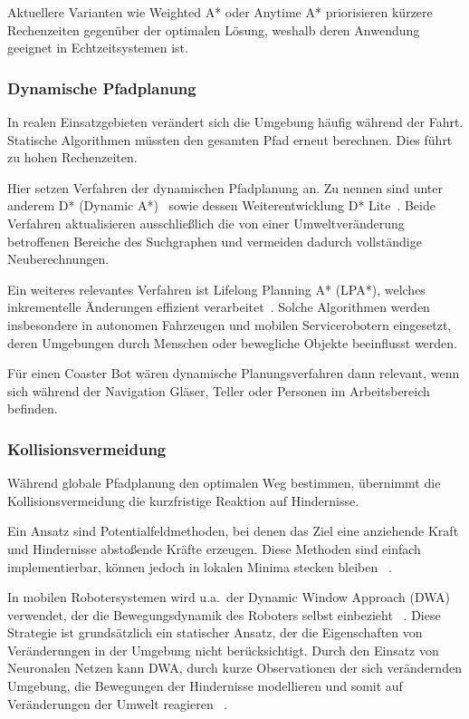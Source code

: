 \documentclass[
  a4paper,
  12pt,
  DIV=12,        %
  parskip=half,  %
  headings=small %
]{scrartcl}
\theoremstyle{definition}
\theoremstyle{definition}
\begin{document}
Aktuellere Varianten wie Weighted A* oder Anytime A* priorisieren kürzere
Rechenzeiten gegenüber der optimalen Lösung, weshalb deren Anwendung geeignet in
Echtzeitsystemen ist\cite{WeightedA,AnytimeA}.

\subsubsection{Dynamische Pfadplanung}

In realen Einsatzgebieten verändert sich die Umgebung häufig während der Fahrt.
Statische Algorithmen müssten den gesamten Pfad erneut berechnen. Dies führt zu
hohen Rechenzeiten.

Hier setzen Verfahren der dynamischen Pfadplanung an. Zu nennen sind unter
anderem D* (Dynamic A*)~\cite{DAlg} sowie dessen Weiterentwicklung D* Lite~\cite{DLite}. Beide
Verfahren aktualisieren ausschließlich die von einer Umweltveränderung
betroffenen Bereiche des Suchgraphen und vermeiden dadurch vollständige
Neuberechnungen.

Ein weiteres relevantes Verfahren ist Lifelong Planning A* (LPA*), welches
inkrementelle Änderungen effizient verarbeitet~\cite{LifelongPlanningA}. Solche
Algorithmen werden insbesondere in autonomen Fahrzeugen und mobilen
Servicerobotern eingesetzt, deren Umgebungen durch Menschen oder bewegliche
Objekte beeinflusst werden.

Für einen Coaster Bot wären dynamische Planungsverfahren dann relevant, wenn
sich während der Navigation Gläser, Teller oder Personen im Arbeitsbereich
befinden.

\subsubsection{Kollisionsvermeidung}

Während globale Pfadplanung den optimalen Weg bestimmen, übernimmt die
Kollisionsvermeidung die kurzfristige Reaktion auf Hindernisse.

Ein Ansatz sind Potentialfeldmethoden, bei denen das Ziel eine anziehende Kraft
und Hindernisse abstoßende Kräfte erzeugen. Diese Methoden sind einfach
implementierbar, können jedoch in lokalen Minima stecken bleiben
~\cite{Potentialfeldmethoden}.

In mobilen Robotersystemen wird u.a.\ der Dynamic Window Approach (DWA)
verwendet, der die Bewegungsdynamik des Roboters selbst einbezieht
~\cite{DynamicWindowApproach}. Diese Strategie ist grundsätzlich ein statischer
Ansatz, der die Eigenschaften von Veränderungen in der Umgebung nicht
berücksichtigt. Durch den Einsatz von Neuronalen Netzen kann DWA, durch kurze
Observationen der sich verändernden Umgebung, die Bewegungen der Hindernisse
modellieren und somit auf Veränderungen der Umwelt reagieren
~\cite{DynamicAdaptiveDynamicWindowApproach}.
\end{document}
